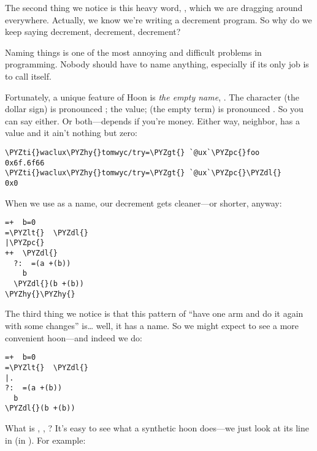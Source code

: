 The second thing we notice is this heavy word, , which
we are dragging around everywhere.  Actually, we know we're
writing a decrement program.  So why do we keep saying decrement,
decrement, decrement?

Naming things is one of the most annoying and difficult problems
in programming.  Nobody should have to name anything, especially
if its only job is to call itself.

Fortunately, a unique feature of Hoon is \emph{the empty name}, \kode{\$}.
The character (the dollar sign) is pronounced ; the value;
(the empty term) is pronounced .  So you can say either.
Or both---depends if you're money.  Either way, neighbor, \kode{\$}
has a value and it ain't nothing but zero:

\begin{framed_shaded}
\begin{Verbatim}[fontsize=\relsize{-2.5},fontseries=b,commandchars=\\\{\}]
\PYZti{}waclux\PYZhy{}tomwyc/try=\PYZgt{} `@ux`\PYZpc{}foo
0x6f.6f66
\PYZti{}waclux\PYZhy{}tomwyc/try=\PYZgt{} `@ux`\PYZpc{}\PYZdl{}
0x0
\end{Verbatim}
\end{framed_shaded}
When we use \kode{\$} as a name, our decrement gets cleaner---or
shorter, anyway:
\begin{framed_shaded}
\begin{Verbatim}[fontsize=\relsize{-2.5},fontseries=b,commandchars=\\\{\}]
=+  b=0
=\PYZlt{}  \PYZdl{}
|\PYZpc{}
++  \PYZdl{}
  ?:  =(a +(b))
    b
  \PYZdl{}(b +(b))
\PYZhy{}\PYZhy{}
\end{Verbatim}
\end{framed_shaded}

The third thing we notice is that this pattern of ``have one arm
and do it again with some changes'' is\ldots{} well, it has a name.
So we might expect to see a more convenient hoon---and indeed
we do:

\begin{framed_shaded}
\begin{Verbatim}[fontsize=\relsize{-2.5},fontseries=b,commandchars=\\\{\}]
=+  b=0
=\PYZlt{}  \PYZdl{}
|.
?:  =(a +(b))
  b
\PYZdl{}(b +(b))
\end{Verbatim}
\end{framed_shaded}
What is , , ?  It's easy to see what a
synthetic hoon does---we just look at its line in 
(in ).  For example:

